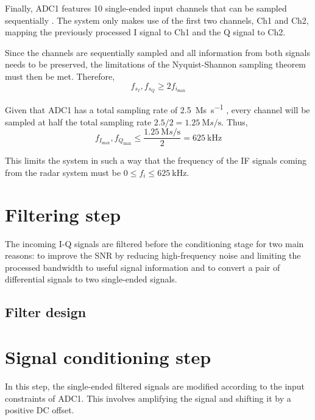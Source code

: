 Finally, ADC1 features 10 single-ended input channels that can be sampled sequentially \cite[p.~355]{STMicroelectronics2022a}. The system only makes use of the first two channels, Ch1 and Ch2, mapping the previously processed I signal to Ch1 and the Q signal to Ch2.

Since the channels are sequentially sampled and all information from both signals needs to be preserved, the limitations of the Nyquist-Shannon sampling theorem must then be met. Therefore,
\begin{equation} \label{eqn:nyquist_sampling}
	f_{s_{I}}, f_{s_{Q}} \ge 2 f_{i_{\max}}
\end{equation}

Given that ADC1 has a total sampling rate of \SI{2.5}{\mega s\per\second} \cite[p.~103]{STMicroelectronics2022}, every channel will be sampled at half the total sampling rate $2.5/2 = \SI{1.25}{\mega s\per\second}$. Thus,
\begin{equation} \label{eqn:nyquist_sampling}
	f_{I_{\max}}, f_{Q_{\max}} \le \frac{\SI{1.25}{\mega s\per\second}}{2} = \SI{625}{\kilo\hertz}
\end{equation}

This limits the system in such a way that the frequency of the IF signals coming from the radar system must be $ 0 \le f_i \le \SI{625}{\kilo\hertz}$.

\section{Filtering step}
The incoming I-Q signals are filtered before the conditioning stage for two main reasons: to improve the SNR by reducing high-frequency noise and limiting the processed bandwidth to useful signal information and to convert a pair of differential signals to two single-ended signals.
\subsection{Filter design}
\section{Signal conditioning step}
In this step, the single-ended filtered signals are modified according to the input constraints of ADC1. This involves amplifying the signal and shifting it by a positive DC offset.

